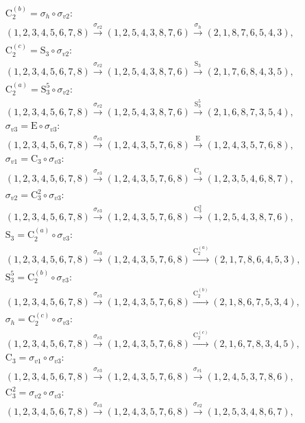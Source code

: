 \begin{align*}
& \mathrm{C}_{2}^{(b)} = \sigma_{h} \circ \sigma_{v2}:\; \\& (1,2,3,4,5,6,7,8) \xrightarrow{\sigma_{v2}} (1,2,5,4,3,8,7,6) \xrightarrow{\sigma_{h}} (2,1,8,7,6,5,4,3), \\
& \mathrm{C}_{2}^{(c)} = \mathrm{S}_{3} \circ \sigma_{v2}:\; \\& (1,2,3,4,5,6,7,8) \xrightarrow{\sigma_{v2}} (1,2,5,4,3,8,7,6) \xrightarrow{\mathrm{S}_{3}} (2,1,7,6,8,4,3,5), \\
& \mathrm{C}_{2}^{(a)} = \mathrm{S}_{3}^{5} \circ \sigma_{v2}:\; \\& (1,2,3,4,5,6,7,8) \xrightarrow{\sigma_{v2}} (1,2,5,4,3,8,7,6) \xrightarrow{\mathrm{S}_{3}^{5}} (2,1,6,8,7,3,5,4), \\
& \sigma_{v3} = \mathrm{E} \circ \sigma_{v3}:\; \\& (1,2,3,4,5,6,7,8) \xrightarrow{\sigma_{v3}} (1,2,4,3,5,7,6,8) \xrightarrow{\mathrm{E}} (1,2,4,3,5,7,6,8), \\
& \sigma_{v1} = \mathrm{C}_{3} \circ \sigma_{v3}:\; \\& (1,2,3,4,5,6,7,8) \xrightarrow{\sigma_{v3}} (1,2,4,3,5,7,6,8) \xrightarrow{\mathrm{C}_{3}} (1,2,3,5,4,6,8,7), \\
& \sigma_{v2} = \mathrm{C}_{3}^{2} \circ \sigma_{v3}:\; \\& (1,2,3,4,5,6,7,8) \xrightarrow{\sigma_{v3}} (1,2,4,3,5,7,6,8) \xrightarrow{\mathrm{C}_{3}^{2}} (1,2,5,4,3,8,7,6), \\
& \mathrm{S}_{3} = \mathrm{C}_{2}^{(a)} \circ \sigma_{v3}:\; \\& (1,2,3,4,5,6,7,8) \xrightarrow{\sigma_{v3}} (1,2,4,3,5,7,6,8) \xrightarrow{\mathrm{C}_{2}^{(a)}} (2,1,7,8,6,4,5,3), \\
& \mathrm{S}_{3}^{5} = \mathrm{C}_{2}^{(b)} \circ \sigma_{v3}:\; \\& (1,2,3,4,5,6,7,8) \xrightarrow{\sigma_{v3}} (1,2,4,3,5,7,6,8) \xrightarrow{\mathrm{C}_{2}^{(b)}} (2,1,8,6,7,5,3,4), \\
& \sigma_{h} = \mathrm{C}_{2}^{(c)} \circ \sigma_{v3}:\; \\& (1,2,3,4,5,6,7,8) \xrightarrow{\sigma_{v3}} (1,2,4,3,5,7,6,8) \xrightarrow{\mathrm{C}_{2}^{(c)}} (2,1,6,7,8,3,4,5), \\
& \mathrm{C}_{3} = \sigma_{v1} \circ \sigma_{v3}:\; \\& (1,2,3,4,5,6,7,8) \xrightarrow{\sigma_{v3}} (1,2,4,3,5,7,6,8) \xrightarrow{\sigma_{v1}} (1,2,4,5,3,7,8,6), \\
& \mathrm{C}_{3}^{2} = \sigma_{v2} \circ \sigma_{v3}:\; \\& (1,2,3,4,5,6,7,8) \xrightarrow{\sigma_{v3}} (1,2,4,3,5,7,6,8) \xrightarrow{\sigma_{v2}} (1,2,5,3,4,8,6,7), \\

\end{align*}
